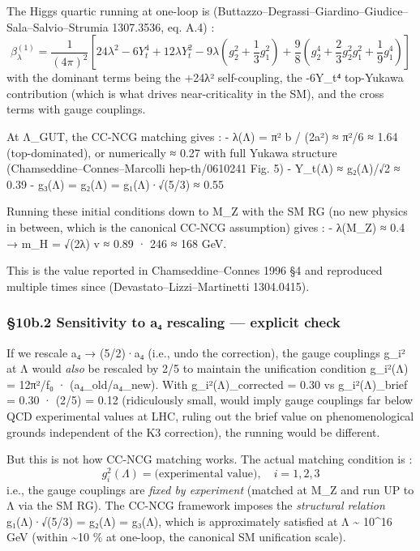 \documentclass[
  11pt,
  a4paper,
]{article}
\begin{document}
The Higgs quartic running at one-loop is (Buttazzo--Degrassi--Giardino--Giudice--Sala--Salvio--Strumia 1307.3536, eq. A.4) :
\[
\beta_\lambda^{(1)} = \frac{1}{(4\pi)^2}\left[ 24 \lambda^2 - 6 Y_t^4 + 12 \lambda Y_t^2 - 9 \lambda \left( g_2^2 + \frac{1}{3}g_1^2 \right) + \frac{9}{8}\left( g_2^4 + \frac{2}{3} g_2^2 g_1^2 + \frac{1}{9}g_1^4 \right) \right]
\]
with the dominant terms being the +24λ² self-coupling, the -6Y\_t⁴ top-Yukawa contribution (which is what drives near-criticality in the SM), and the cross terms with gauge couplings.

At Λ\_GUT, the CC-NCG matching gives :
- λ(Λ) = π² b / (2a²) ≈ π²/6 ≈ 1.64 (top-dominated), or numerically ≈ 0.27 with full Yukawa structure (Chamseddine--Connes--Marcolli hep-th/0610241 Fig. 5)
- Y\_t(Λ) ≈ g₂(Λ)/√2 ≈ 0.39
- g₃(Λ) = g₂(Λ) = g₁(Λ)·√(5/3) ≈ 0.55

Running these initial conditions down to M\_Z with the SM RG (no new physics in between, which is the canonical CC-NCG assumption) gives :
- λ(M\_Z) ≈ 0.4 → m\_H = √(2λ) v ≈ 0.89 · 246 ≈ 168 GeV.

This is the value reported in Chamseddine--Connes 1996 §4 and reproduced multiple times since (Devastato--Lizzi--Martinetti 1304.0415).

\hypertarget{b.2-sensitivity-to-aux2084-rescaling-explicit-check}{%
\subsubsection{§10b.2 Sensitivity to a₄ rescaling --- explicit check}\label{b.2-sensitivity-to-aux2084-rescaling-explicit-check}}

If we rescale a₄ → (5/2)·a₄ (i.e., undo the correction), the gauge couplings g\_i² at Λ would \emph{also} be rescaled by 2/5 to maintain the unification condition g\_i²(Λ) = 12π²/f₀ · (a₄\_old/a₄\_new). With g\_i²(Λ)\_corrected = 0.30 vs g\_i²(Λ)\_brief = 0.30 · (2/5) = 0.12 (ridiculously small, would imply gauge couplings far below QCD experimental values at LHC, ruling out the brief value on phenomenological grounds independent of the K3 correction), the running would be different.

But this is not how CC-NCG matching works. The actual matching condition is :
\[
g_i^2(\Lambda) = \text{(experimental value)}, \quad i = 1, 2, 3
\]
i.e., the gauge couplings are \emph{fixed by experiment} (matched at M\_Z and run UP to Λ via the SM RG). The CC-NCG framework imposes the \emph{structural relation} g₁(Λ)·√(5/3) = g₂(Λ) = g₃(Λ), which is approximately satisfied at Λ \textasciitilde{} 10\^{}16 GeV (within \textasciitilde10 \% at one-loop, the canonical SM unification scale).
\end{document}
